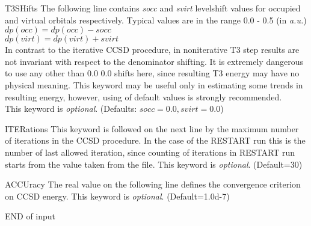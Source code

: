 \begin{keywordlist}
\item[T3SHifts]
The following line contains {\it socc} and {\it svirt} levelshift values for
occupied and virtual orbitals respectively.
Typical values are in the range 0.0 - 0.5 (in {\it a.u.})\\
${dp(occ)=dp(occ)-socc}$ \\
${dp(virt)=dp(virt)+svirt}$\\
In contrast to the iterative CCSD procedure, in noniterative T3 step results are
not invariant with respect to the denominator shifting. It is extremely dangerous
to use any other than 0.0 0.0 shifts here, since resulting T3 energy may have
no physical meaning. This keyword may be useful only in estimating some
trends in resulting energy, however, using of default values is strongly
recommended. \\
This keyword is {\it optional}. (Defaults: ${socc=0.0, svirt=0.0}$)
\item[ITERations]
This keyword is followed on the next line by the maximum number
of iterations in the CCSD procedure. In the case of the RESTART run this is the
number of last allowed iteration, since counting of iterations in
RESTART run starts from the value taken from the  file.
This keyword is {\it optional}. (Default=30)
\item[ACCUracy]
The real value on the following line defines the convergence criterion on
CCSD energy. This keyword is {\it optional}. (Default=1.0d-7)
\item[END of input]

\end{keywordlist}
